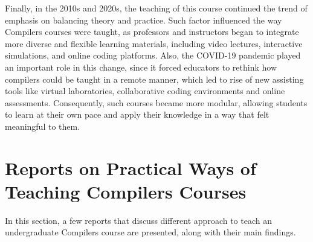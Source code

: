 Finally, in the 2010s and 2020s, the teaching of this course continued the trend of emphasis on balancing theory and practice. Such factor influenced the way Compilers courses were taught, as professors and instructors began to integrate more diverse and flexible learning materials, including video lectures, interactive simulations, and online coding platforms. Also, the COVID-19 pandemic played an important role in this change, since it forced educators to rethink how compilers could be taught in a remote manner, which led to rise of new assisting tools like virtual laboratories, collaborative coding environments and online assessments. Consequently, such courses became more modular, allowing students to learn at their own pace and apply their knowledge in a way that felt meaningful to them.

\section{Reports on Practical Ways of Teaching Compilers \newline Courses}
In this section, a few reports that discuss different approach to teach an undergraduate Compilers course are presented, along with their main findings.

